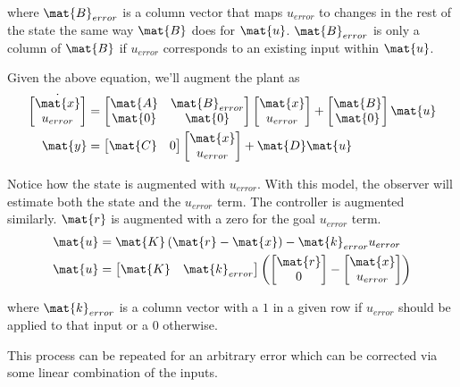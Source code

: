 where $\mat{B}_{error}$ is a column vector that maps $u_{error}$ to changes in
the rest of the \gls{state} the same way $\mat{B}$ does for $\mat{u}$.
$\mat{B}_{error}$ is only a column of $\mat{B}$ if $u_{error}$ corresponds to an
existing \gls{input} within $\mat{u}$.

Given the above equation, we'll augment the \gls{plant} as
\begin{align*}
  \dot{\begin{bmatrix}
    \mat{x} \\
    u_{error}
  \end{bmatrix}} &=
  \begin{bmatrix}
    \mat{A} & \mat{B}_{error} \\
    \mat{0} & \mat{0}
  \end{bmatrix}
  \begin{bmatrix}
    \mat{x} \\
    u_{error}
  \end{bmatrix} +
  \begin{bmatrix}
    \mat{B} \\
    \mat{0}
  \end{bmatrix}
  \mat{u} \\
  \mat{y} &= \begin{bmatrix}
    \mat{C} & 0
  \end{bmatrix} \begin{bmatrix}
    \mat{x} \\
    u_{error}
  \end{bmatrix} + \mat{D}\mat{u}
\end{align*}

Notice how the \gls{state} is augmented with $u_{error}$. With this \gls{model},
the \gls{observer} will estimate both the \gls{state} and the $u_{error}$ term.
The controller is augmented similarly. $\mat{r}$ is augmented with a zero for
the goal $u_{error}$ term.
\begin{align*}
  \mat{u} &= \mat{K} \left(\mat{r} - \mat{x}\right) - \mat{k}_{error}u_{error}
    \\
  \mat{u} &=
  \begin{bmatrix}
    \mat{K} & \mat{k}_{error}
  \end{bmatrix}
  \left(\begin{bmatrix}
    \mat{r} \\
    0
  \end{bmatrix} -
  \begin{bmatrix}
    \mat{x} \\
    u_{error}
  \end{bmatrix}\right)
\end{align*}

where $\mat{k}_{error}$ is a column vector with a $1$ in a given row if
$u_{error}$ should be applied to that \gls{input} or a $0$ otherwise.

This process can be repeated for an arbitrary \gls{error} which can be corrected
via some linear combination of the \glspl{input}.
